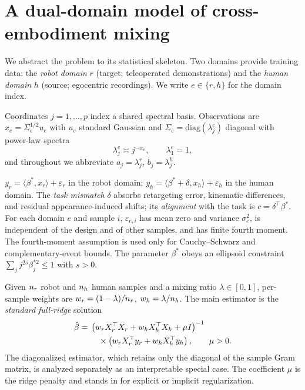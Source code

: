 \section{A dual-domain model of cross-embodiment mixing}
\label{sec:setup}

We abstract the problem to its statistical skeleton.
Two domains provide training data: the \emph{robot domain} $r$ (target; teleoperated demonstrations) and the \emph{human domain} $h$ (source; egocentric recordings).
We write $e \in \{r,h\}$ for the domain index.

\begin{assumption}\label{ass:a1}
Coordinates $j = 1,\dots,p$ index a shared spectral basis.
Observations are $x_e = \Sigma_e^{1/2} u_e$ with $u_e$ standard Gaussian and $\Sigma_e = \mathrm{diag}(\lambda^e_j)$ diagonal with power-law spectra
\begin{equation}
  \lambda^e_j \asymp j^{-\alpha_e}, \qquad \lambda^e_1 = 1,
  \label{eq:powerlaw}
\end{equation}
and throughout we abbreviate $a_j = \lambda^r_j$, $b_j = \lambda^h_j$.
\end{assumption}

\begin{assumption}\label{ass:a2}
$y_r = \langle \beta^*, x_r \rangle + \varepsilon_r$ in the robot domain; $y_h = \langle \beta^* + \delta, x_h \rangle + \varepsilon_h$ in the human domain.
The \emph{task mismatch} $\delta$ absorbs retargeting error, kinematic differences, and residual appearance-induced shifts; its \emph{alignment} with the task is $c = \delta^\top\beta^*$.
For each domain $e$ and sample $i$, $\varepsilon_{e,i}$ has mean zero and variance $\sigma_e^2$, is independent of the design and of other samples, and has finite fourth moment. The fourth-moment assumption is used only for Cauchy--Schwarz and complementary-event bounds. The parameter $\beta^*$ obeys an ellipsoid constraint $\sum_j j^{2s}\beta_j^{*2} \le 1$ with $s > 0$.
\end{assumption}

\begin{assumption}\label{ass:a3}
Given $n_r$ robot and $n_h$ human samples and a mixing ratio $\lambda \in [0,1]$, per-sample weights are $w_r = (1-\lambda)/n_r$, $w_h = \lambda/n_h$. The main estimator is the \emph{standard full-ridge} solution
\begin{align}
  \hat\beta ={}&
  \left(w_r X_r^\top X_r + w_h X_h^\top X_h + \mu I\right)^{-1}\notag\\
  &\quad\times
  \left(w_r X_r^\top y_r + w_h X_h^\top y_h\right),
  \qquad \mu>0.
  \label{eq:estimator}
\end{align}
The diagonalized estimator, which retains only the diagonal of the sample Gram matrix, is analyzed separately as an interpretable special case. The coefficient $\mu$ is the ridge penalty and stands in for explicit or implicit regularization.
\end{assumption}

